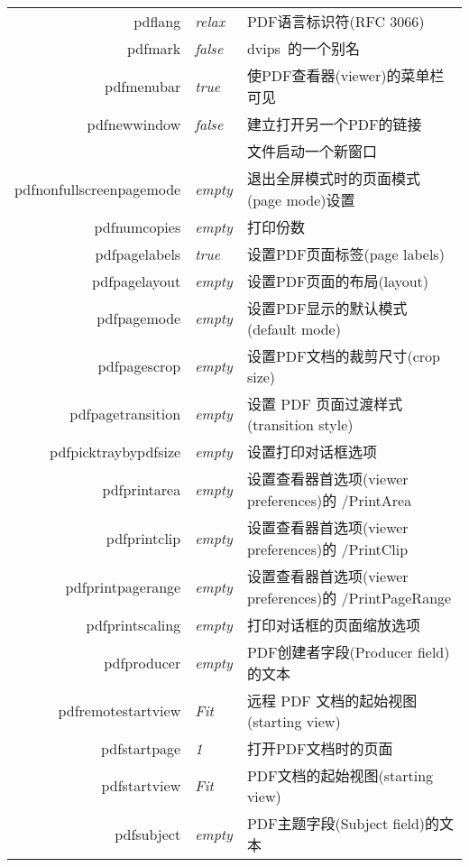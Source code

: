 \documentclass{article}
\begin{document}
\begin{longtable}{@{}>{\ttfamily}rlp{7cm}@{}}
pdflang            & \textit{relax}         & PDF语言标识符(RFC 3066) \\
pdfmark            & \textit{false}         & \textsf{dvips}\ 的一个别名 \\
pdfmenubar         & \textit{true}          & 使PDF查看器(viewer)的菜单栏可见\\
pdfnewwindow       & \textit{false}         & 建立打开另一个PDF的链接 \\
                   &                        & 文件启动一个新窗口 \\
pdfnonfullscreenpagemode
                   & \textit{empty}         & 退出全屏模式时的页面模式(page mode)设置\\
pdfnumcopies       & \textit{empty}         & 打印份数\\
pdfpagelabels      & \textit{true}          & 设置PDF页面标签(page labels)\\
pdfpagelayout      & \textit{empty}         & 设置PDF页面的布局(layout)\\
pdfpagemode        & \textit{empty}         & 设置PDF显示的默认模式(default mode)\\
pdfpagescrop       & \textit{empty}         & 设置PDF文档的裁剪尺寸(crop size)\\
pdfpagetransition  & \textit{empty}         & 设置 PDF 页面过渡样式(transition style)\\
pdfpicktraybypdfsize
                   & \textit{empty}         & 设置打印对话框选项 \\
pdfprintarea       & \textit{empty}         & 设置查看器首选项(viewer preferences)的 /PrintArea\\
pdfprintclip       & \textit{empty}         & 设置查看器首选项(viewer preferences)的 /PrintClip \\
pdfprintpagerange  & \textit{empty}         & 设置查看器首选项(viewer preferences)的 /PrintPageRange \\
pdfprintscaling    & \textit{empty}         & 打印对话框的页面缩放选项 \\
pdfproducer        & \textit{empty}         & PDF创建者字段(Producer field)的文本\\
pdfremotestartview & \textit{Fit}           & 远程 PDF 文档的起始视图(starting view)\\
pdfstartpage       & \textit{1}             & 打开PDF文档时的页面\\
pdfstartview       & \textit{Fit}           & PDF文档的起始视图(starting view) \\
pdfsubject         & \textit{empty}         & PDF主题字段(Subject field)的文本\\

\end{longtable}
\end{document}
